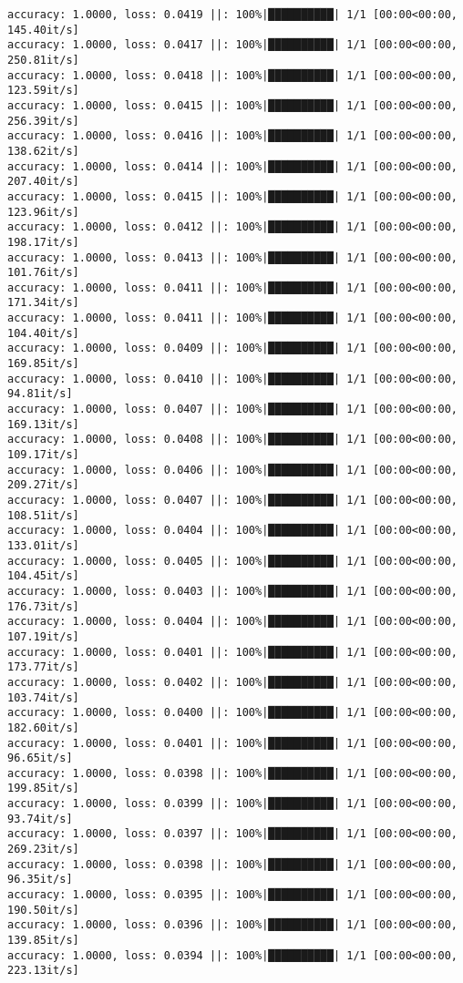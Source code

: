 \documentclass[
]{article}
\begin{document}
\begin{verbatim}
accuracy: 1.0000, loss: 0.0419 ||: 100%|██████████| 1/1 [00:00<00:00, 145.40it/s]
accuracy: 1.0000, loss: 0.0417 ||: 100%|██████████| 1/1 [00:00<00:00, 250.81it/s]
accuracy: 1.0000, loss: 0.0418 ||: 100%|██████████| 1/1 [00:00<00:00, 123.59it/s]
accuracy: 1.0000, loss: 0.0415 ||: 100%|██████████| 1/1 [00:00<00:00, 256.39it/s]
accuracy: 1.0000, loss: 0.0416 ||: 100%|██████████| 1/1 [00:00<00:00, 138.62it/s]
accuracy: 1.0000, loss: 0.0414 ||: 100%|██████████| 1/1 [00:00<00:00, 207.40it/s]
accuracy: 1.0000, loss: 0.0415 ||: 100%|██████████| 1/1 [00:00<00:00, 123.96it/s]
accuracy: 1.0000, loss: 0.0412 ||: 100%|██████████| 1/1 [00:00<00:00, 198.17it/s]
accuracy: 1.0000, loss: 0.0413 ||: 100%|██████████| 1/1 [00:00<00:00, 101.76it/s]
accuracy: 1.0000, loss: 0.0411 ||: 100%|██████████| 1/1 [00:00<00:00, 171.34it/s]
accuracy: 1.0000, loss: 0.0411 ||: 100%|██████████| 1/1 [00:00<00:00, 104.40it/s]
accuracy: 1.0000, loss: 0.0409 ||: 100%|██████████| 1/1 [00:00<00:00, 169.85it/s]
accuracy: 1.0000, loss: 0.0410 ||: 100%|██████████| 1/1 [00:00<00:00, 94.81it/s]
accuracy: 1.0000, loss: 0.0407 ||: 100%|██████████| 1/1 [00:00<00:00, 169.13it/s]
accuracy: 1.0000, loss: 0.0408 ||: 100%|██████████| 1/1 [00:00<00:00, 109.17it/s]
accuracy: 1.0000, loss: 0.0406 ||: 100%|██████████| 1/1 [00:00<00:00, 209.27it/s]
accuracy: 1.0000, loss: 0.0407 ||: 100%|██████████| 1/1 [00:00<00:00, 108.51it/s]
accuracy: 1.0000, loss: 0.0404 ||: 100%|██████████| 1/1 [00:00<00:00, 133.01it/s]
accuracy: 1.0000, loss: 0.0405 ||: 100%|██████████| 1/1 [00:00<00:00, 104.45it/s]
accuracy: 1.0000, loss: 0.0403 ||: 100%|██████████| 1/1 [00:00<00:00, 176.73it/s]
accuracy: 1.0000, loss: 0.0404 ||: 100%|██████████| 1/1 [00:00<00:00, 107.19it/s]
accuracy: 1.0000, loss: 0.0401 ||: 100%|██████████| 1/1 [00:00<00:00, 173.77it/s]
accuracy: 1.0000, loss: 0.0402 ||: 100%|██████████| 1/1 [00:00<00:00, 103.74it/s]
accuracy: 1.0000, loss: 0.0400 ||: 100%|██████████| 1/1 [00:00<00:00, 182.60it/s]
accuracy: 1.0000, loss: 0.0401 ||: 100%|██████████| 1/1 [00:00<00:00, 96.65it/s]
accuracy: 1.0000, loss: 0.0398 ||: 100%|██████████| 1/1 [00:00<00:00, 199.85it/s]
accuracy: 1.0000, loss: 0.0399 ||: 100%|██████████| 1/1 [00:00<00:00, 93.74it/s]
accuracy: 1.0000, loss: 0.0397 ||: 100%|██████████| 1/1 [00:00<00:00, 269.23it/s]
accuracy: 1.0000, loss: 0.0398 ||: 100%|██████████| 1/1 [00:00<00:00, 96.35it/s]
accuracy: 1.0000, loss: 0.0395 ||: 100%|██████████| 1/1 [00:00<00:00, 190.50it/s]
accuracy: 1.0000, loss: 0.0396 ||: 100%|██████████| 1/1 [00:00<00:00, 139.85it/s]
accuracy: 1.0000, loss: 0.0394 ||: 100%|██████████| 1/1 [00:00<00:00, 223.13it/s]

\end{verbatim}
\end{document}
